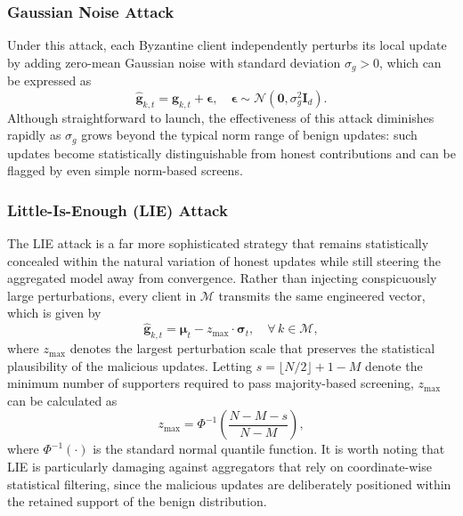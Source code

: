 \documentclass[journal]{IEEEtran}
\begin{document}
\subsubsection{Gaussian Noise Attack}
Under this attack, each Byzantine client independently perturbs its local update by adding zero-mean Gaussian noise with standard deviation $\sigma_g > 0$, which can be expressed as
\begin{equation}
\hat{\mathbf{g}}_{k,t} = \mathbf{g}_{k,t} + \boldsymbol{\epsilon}, \quad \boldsymbol{\epsilon} \sim \mathcal{N}(\mathbf{0}, \sigma_g^2 \mathbf{I}_d).
\label{eq:gaussian_attack}
\end{equation}
Although straightforward to launch, the effectiveness of this attack diminishes rapidly as $\sigma_g$ grows beyond the typical norm range of benign updates: such updates become statistically distinguishable from honest contributions and can be flagged by even simple norm-based screens.

\subsubsection{Little-Is-Enough (LIE) Attack~\cite{baruch2019little}}
The LIE attack is a far more sophisticated strategy that remains statistically concealed within the natural variation of honest updates while still steering the aggregated model away from convergence. Rather than injecting conspicuously large perturbations, every client in $\mathcal{M}$ transmits the same engineered vector, which is given by
\begin{equation}
\hat{\mathbf{g}}_{k,t} = \boldsymbol{\mu}_t - z_{\max} \cdot \boldsymbol{\sigma}_t, \quad \forall\, k \in \mathcal{M},
\label{eq:lie_attack}
\end{equation}
where $z_{\max}$ denotes the largest perturbation scale that preserves the statistical plausibility of the malicious updates. Letting $s = \lfloor N/2 \rfloor + 1 - M$ denote the minimum number of supporters required to pass majority-based screening, $z_{\max}$ can be calculated as
\begin{equation}
z_{\max} = \Phi^{-1}\!\left(\frac{N - M - s}{N - M}\right),
\label{eq:zmax}
\end{equation}
where $\Phi^{-1}(\cdot)$ is the standard normal quantile function. It is worth noting that LIE is particularly damaging against aggregators that rely on coordinate-wise statistical filtering, since the malicious updates are deliberately positioned within the retained support of the benign distribution.
\end{document}
